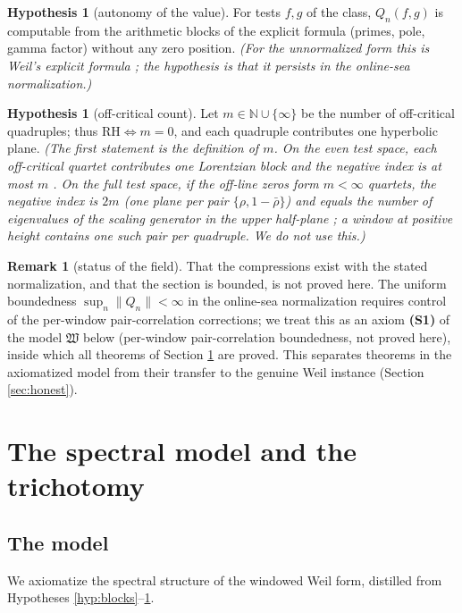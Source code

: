 \documentclass[11pt,reqno]{amsart}
\theoremstyle{definition}
\newtheorem{remark}[theorem]{Remark}
\newtheorem{assumption}[theorem]{Hypothesis}
\newcommand{\N}{\mathbb{N}}
\begin{document}
\begin{assumption}[autonomy of the value]\label{hyp:autonomy}
For tests \(f,g\) of the class, \(Q_n(f,g)\) is computable from the arithmetic
blocks of the explicit formula (primes, pole, gamma factor) without any zero
position. \emph{(For the unnormalized form this is Weil's explicit formula
\cite{Weil1952}; the hypothesis is that it persists in the online-sea
normalization.)}
\end{assumption}

\begin{assumption}[off-critical count]\label{hyp:spectral}
Let \(m\in\N\cup\{\infty\}\) be the number of off-critical quadruples; thus
\(\mathrm{RH}\iff m=0\), and each quadruple contributes one hyperbolic plane.
\emph{(The first statement is the definition of \(m\). On the even test space,
each off-critical quartet contributes one Lorentzian block and the negative index
is at most \(m\) \cite[Theorem~3.1, Corollary~6.5]{P18}. On the full test space,
if the off-line zeros form \(m<\infty\) quartets, the negative index is \(2m\)
(one plane per pair \(\{\rho,1-\bar\rho\}\)) and equals the number of
eigenvalues of the scaling generator in the upper half-plane
\cite[Proposition~5.3]{P25}; a window at positive height contains one such pair
per quadruple. We do not use this.)}
\end{assumption}

\begin{remark}[status of the field]\label{rem:field-status}
That the compressions exist with the stated normalization, and that the section
is bounded, is not proved here. The uniform
boundedness \(\sup_n\|Q_n\|<\infty\) in the online-sea normalization requires
control of the per-window pair-correlation corrections; we treat this as an
axiom \textbf{(S1)} of the model \(\mathfrak W\) below
(per-window pair-correlation boundedness, not proved here), inside which all
theorems of Section \ref{sec:trichotomy} are proved. This separates theorems in
the axiomatized model from their transfer to the genuine Weil instance (Section
\ref{sec:honest}).
\end{remark}

\section{The spectral model and the trichotomy}\label{sec:trichotomy}

\subsection{The model}
We axiomatize the spectral structure of the windowed Weil form, distilled from
Hypotheses \ref{hyp:blocks}--\ref{hyp:spectral}.
\end{document}
